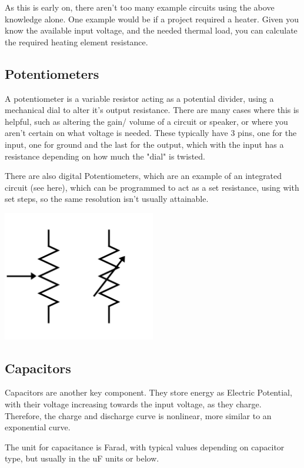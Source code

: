 \documentclass[a4paper,11pt]{report}
\newcommand{\Theory}[1] %
{
\phantomsection %
\todo[inline, color=green!30]{\textbf{#1}} %
\vspace{1em} %
}
\begin{document}
As this is early on, there aren't too many example circuits using the above knowledge alone. One example would be if a project required a heater. Given you know the available input voltage, and the needed thermal load, you can calculate the required heating element resistance.

\subsection{Potentiometers}

A potentiometer is a variable resistor acting as a potential divider, using a mechanical dial to alter it's output resistance. There are many cases where this is helpful, such as altering the gain/ volume of a circuit or speaker, or where you aren't certain on what voltage is needed. These typically have 3 pins, one for the input, one for ground and the last for the output, which with the input has a resistance depending on how much the "dial" is twisted.

There are also digital Potentiometers, which are an example of an integrated circuit (see here), which can be programmed to act as a set resistance, using with set steps, so the same resolution isn't usually attainable.

\includegraphics[width=0.5\textwidth]{potentiometer1}

\subsection{Capacitors}

\Theory{What are Capacitors?}

Capacitors are another key component. They store energy as Electric Potential, with their voltage increasing towards the input voltage, as they charge. Therefore, the charge and discharge curve is nonlinear, more similar to an exponential curve.

The unit for capacitance is Farad, with typical values depending on capacitor type, but usually in the uF units or below.
\end{document}
